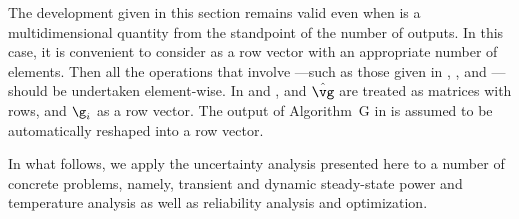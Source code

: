 \begin{remark} 
The development given in this section remains valid even when \g is a
multidimensional quantity from the standpoint of the number of outputs. In this
case, it is convenient to consider \g as a row vector with an appropriate number
of elements. Then all the operations that involve \g---such as those given in
, , and
---should be undertaken element-wise. In
 and , \vg and $\hat{\vg}$ are
treated as matrices with \nc rows, and $\g_i$ as a row vector. The output of
Algorithm~G in  is assumed to be automatically reshaped
into a row vector.
\end{remark}

In what follows, we apply the uncertainty analysis presented here to a number of
concrete problems, namely, transient and dynamic steady-state power and
temperature analysis as well as reliability analysis and optimization.
